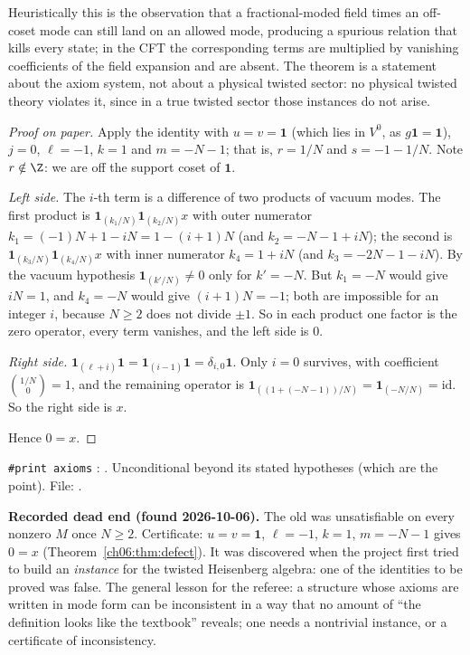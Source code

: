 \begin{physics}
Heuristically this is the observation that a fractional-moded field times an off-coset mode can still land on an allowed mode, producing a spurious relation that kills every state; in the CFT the corresponding terms are multiplied by vanishing coefficients of the field expansion and are absent. The theorem is a statement about the axiom system, not about a physical twisted sector: no physical twisted theory violates it, since in a true twisted sector those instances do not arise.
\end{physics}
\begin{proof}[Proof on paper]
Apply the identity with $u=v=\mathbf 1$ (which lies in $V^0$, as $g\mathbf 1=\mathbf 1$), $j=0$,
$\ell=-1$, $k=1$ and $m=-N-1$; that is, $r=1/N$ and $s=-1-1/N$.  Note $r\notin\Z$: we are off the
support coset of $\mathbf 1$.

\emph{Left side.}  The $i$-th term is a difference of two products of vacuum modes.  The first
product is $\mathbf 1_{(k_1/N)}\mathbf 1_{(k_2/N)}x$ with outer numerator
$k_1=(-1)N+1-iN=1-(i+1)N$ (and $k_2=-N-1+iN$); the second is
$\mathbf 1_{(k_3/N)}\mathbf 1_{(k_4/N)}x$ with inner numerator $k_4=1+iN$ (and $k_3=-2N-1-iN$).  By
the vacuum hypothesis $\mathbf 1_{(k'/N)}\ne 0$ only for $k'=-N$.  But $k_1=-N$ would give $iN=1$,
and $k_4=-N$ would give $(i+1)N=-1$; both are impossible for an integer $i$, because $N\ge2$ does
not divide $\pm1$.  So in each product one factor is the zero operator, every term vanishes, and
the left side is $0$.

\emph{Right side.}  $\mathbf 1_{(\ell+i)}\mathbf 1=\mathbf 1_{(i-1)}\mathbf 1=\delta_{i,0}\mathbf 1$.
Only $i=0$ survives, with coefficient $\binom{1/N}{0}=1$, and the remaining operator is
$\mathbf 1_{((1+(-N-1))/N)}=\mathbf 1_{(-N/N)}=\mathrm{id}$.  So the right side is $x$.

Hence $0=x$.
\end{proof}
\begin{status}
\texttt{\#print axioms} : .
Unconditional beyond its stated hypotheses (which are the point).  File:
.
\end{status}

\begin{warning}
\textbf{Recorded dead end (found 2026-10-06).}  The old  was
unsatisfiable on every nonzero $M$ once $N\ge2$.  Certificate: $u=v=\mathbf 1$, $\ell=-1$, $k=1$,
$m=-N-1$ gives $0=x$ (Theorem~\ref{ch06:thm:defect}).  It was discovered when the project first
tried to build an \emph{instance} for the twisted Heisenberg algebra: one of the identities to be
proved was false.  The general lesson for the referee: a structure whose axioms are written in mode
form can be inconsistent in a way that no amount of ``the definition looks like the textbook''
reveals; one needs a nontrivial instance, or a certificate of inconsistency.
\end{warning}

